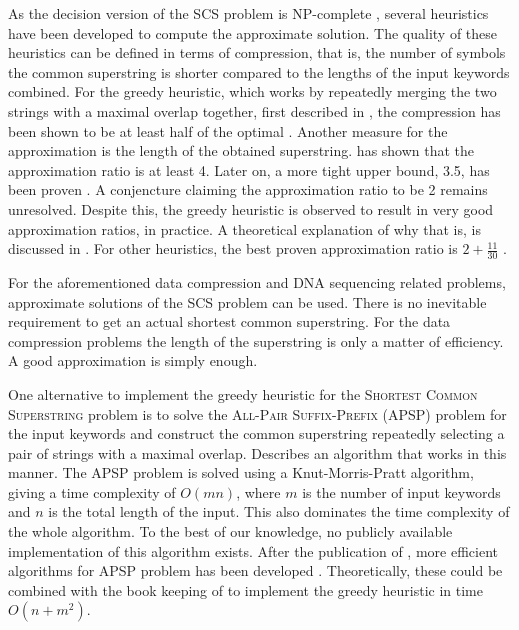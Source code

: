 \documentclass[english,twoside,censored,csm,algorithms-track-2020]{HYthesisML}
\theoremstyle{plain}
\theoremstyle{definition}
\begin{document}
As the decision version of the SCS problem is \textsc{NP}-complete \citep{Gallant80},
several heuristics have been
developed to compute the approximate solution.
The quality of these heuristics
can be defined in terms of compression, that is, the number of symbols the common superstring
is shorter compared to the lengths of the input keywords combined. For the greedy heuristic,
which works by repeatedly merging the two strings with a maximal overlap together, first
described in \citep{Gallant82}, the compression has been shown to be at least half of the optimal
\citep{Tarhio88}. Another measure for the approximation is the length of the
obtained superstring. \cite{Blum94} has shown that the approximation ratio is at least 4.
Later on, a more tight upper bound, 3.5, has been proven \citep{Kaplan05}.
A conjencture \citep{Tarhio88} claiming the approximation ratio to be 2 remains unresolved.
Despite this,
the greedy heuristic is observed to result in very good approximation
ratios, in practice. A theoretical explanation of why that is, is discussed in \citep{Ma08}.
For other heuristics,
the best proven approximation ratio is $2 + \frac{11}{30}$ \citep{Paluch14}.

For the aforementioned data compression and DNA sequencing related problems,
approximate solutions of the SCS problem can be used. There is no inevitable requirement
to get an actual shortest common superstring. For the data compression problems the length of
the superstring is only a matter of efficiency. A good approximation is simply enough. 

One alternative to implement the greedy heuristic for the \textsc{Shortest Common Superstring}
problem is to solve the 
\textsc{All-Pair Suffix-Prefix} (APSP) problem \citep{Lim17} for the input keywords and construct the
common superstring repeatedly selecting a pair of strings with a maximal overlap.
\citep{Tarhio88} Describes an algorithm that works in this manner. The APSP problem is solved
using a Knut-Morris-Pratt algorithm, giving a time complexity of $O(mn)$, where $m$ is the
number of input keywords and $n$ is the total length of the input. This also dominates the time
complexity of the whole algorithm. To the best of our knowledge, no publicly available
implementation of this algorithm exists. After the publication of \citep{Tarhio88}, more efficient
algorithms for APSP problem has been developed \citep{Gusfield92}. Theoretically, these could be
combined with the book keeping of \citep{Tarhio88} to implement the greedy heuristic in time
$O(n+m^2)$.
\end{document}
